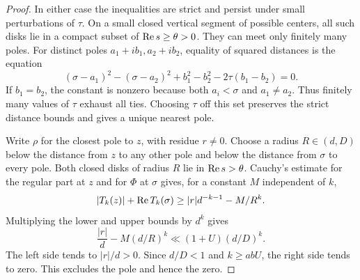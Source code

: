 \begin{proof}
In either case the inequalities are strict and persist
under small perturbations of \(\tau\). On a small closed vertical segment of possible centers, all such
disks lie in a compact subset of \(\operatorname{Re} s\ge\theta>0\).
They can meet only finitely many poles. For distinct poles
\(a_1+ib_1,a_2+ib_2\), equality of squared distances is the equation
\[
    (\sigma-a_1)^2-(\sigma-a_2)^2
       +b_1^2-b_2^2-2\tau(b_1-b_2)=0 .
\]
If \(b_1=b_2\), the constant is nonzero because both \(a_i<\sigma\)
and \(a_1\ne a_2\). Thus finitely many values of \(\tau\) exhaust
all ties. Choosing \(\tau\) off this set preserves the strict
distance bounds and gives a unique nearest pole.

Write \(\rho\) for the closest pole to \(z\), with residue \(r\ne 0\).
Choose a radius \(R\in(d,D)\) below the distance from \(z\) to any other
pole and below the distance from \(\sigma\) to every pole.
Both closed disks of radius \(R\) lie in \(\operatorname{Re} s>\theta\).
Cauchy's estimate for the regular part at \(z\) and for \(\Phi\)
at \(\sigma\) gives, for a constant \(M\) independent of \(k\),
\[
 |T_k(z)|+\operatorname{Re} T_k(\sigma)\geq |r|d^{-k-1}-M/R^k .
\]
Multiplying the lower and upper bounds by \(d^k\) gives
\[
 \frac{|r|}{d}-M(d/R)^k
         \ll (1+U)(d/D)^k .
\]
The left side tends to \(|r|/d>0\). Since \(d/D<1\) and
\(k\ge abU\), the right side tends to zero.
This excludes the pole and hence the zero.
\end{proof}
